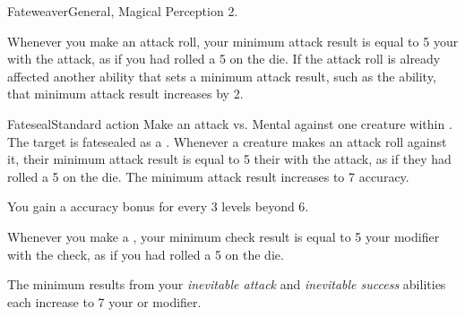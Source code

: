  \begin{feat}{Fateweaver}{General, Magical}
    \featpre Perception 2.

     Whenever you make an attack roll, your minimum attack result is equal to 5 \add your  with the attack, as if you had rolled a 5 on the die.
    If the attack roll is already affected another ability that sets a minimum attack result, such as the  ability, that minimum attack result increases by 2.

    \begin{magicalactiveability}{Fateseal}{Standard action}
      \rankline
      Make an attack vs. Mental against one creature within \medrange.
      \hit The target is fatesealed as a .
      Whenever a creature makes an attack roll against it, their minimum attack result is equal to 5 \add their  with the attack, as if they had rolled a 5 on the die.
      \crit The minimum attack result increases to 7 \add accuracy.

      \rankline
      You gain a  accuracy bonus for every 3 levels beyond 6.
    \end{magicalactiveability}

     Whenever you make a , your minimum check result is equal to 5 \add your modifier with the check, as if you had rolled a 5 on the die.

     The minimum results from your \textit{inevitable attack} and \textit{inevitable success} abilities each increase to 7 \add your  or modifier.
  \end{feat}



